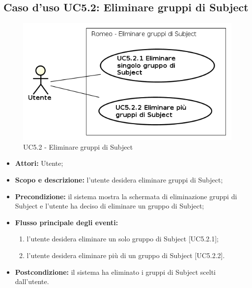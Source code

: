 \subsection{Caso d'uso UC5.2: Eliminare gruppi di Subject}
\begin{figure}[!h]
\begin{center}
\includegraphics[scale=0.6]{./img/Use_Case/UC5_2}
\caption{UC5.2 - Eliminare gruppi di Subject}
\end{center}
\end{figure}
\begin{itemize}
\item \textbf{Attori:} Utente;
\item \textbf{Scopo e descrizione:} l'utente desidera eliminare gruppi di Subject\glossario{};
\item \textbf{Precondizione:} il sistema mostra la schermata di eliminazione gruppi di Subject\glossario{} e l'utente ha deciso di eliminare un gruppo di Subject\glossario{};
\item \textbf{Flusso principale degli eventi:}
\begin{enumerate}
\item l'utente desidera eliminare un solo gruppo di Subject\glossario{} [UC5.2.1];
\item l'utente desidera eliminare più di un gruppo di Subject\glossario{} [UC5.2.2].
\end{enumerate}
\item \textbf{Postcondizione:} il sistema ha eliminato i gruppi di Subject\glossario{} scelti dall'utente.
\end{itemize}


